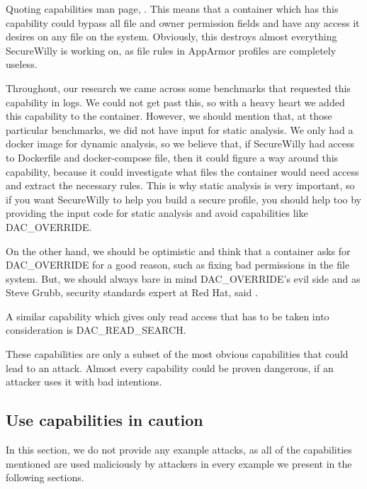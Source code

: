 \begin{description}[style=nextline]
\item[DAC\_OVERRIDE]
Quoting capabilities man page, .
This means that a container which has this capability could bypass all file and owner permission fields and have any access it desires on any file on the system. Obviously, this destroys almost everything SecureWilly is working on, as file rules in AppArmor profiles are completely useless. 

Throughout, our research we came across some benchmarks that requested this capability in logs. We could not get past this, so with a heavy heart we added this capability to the container. However, we should mention that, at those particular benchmarks, we did not have input for static analysis. We only had a docker image for dynamic analysis, so we believe that, if SecureWilly had access to Dockerfile and docker-compose file, then it could figure a way around this capability, because it could investigate what files the container would need access and extract the necessary rules. This is why static analysis is very important, so if you want SecureWilly to help you build a secure profile, you should help too by providing the input code for static analysis and avoid capabilities like DAC\_OVERRIDE.

On the other hand, we should be optimistic and think that a container asks for DAC\_OVERRIDE for a good reason, such as fixing bad permissions in the file system.
But, we should always bare in mind DAC\_OVERRIDE's evil side and as Steve Grubb, security standards expert at Red Hat, said .

A similar capability which gives only read access that has to be taken into consideration is DAC\_READ\_SEARCH.
\end{description}

These capabilities are only a subset of the most obvious capabilities that could lead to an attack. Almost every capability could be proven dangerous, if an attacker uses it with bad intentions. 

\subsection{Use capabilities in caution}
In this section, we do not provide any example attacks, as all of the capabilities mentioned are used maliciously by attackers in every example we present in the following sections.

